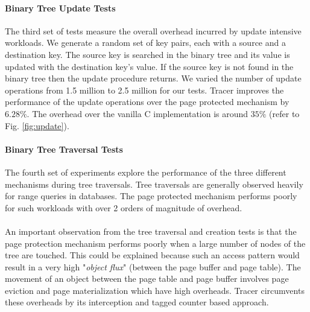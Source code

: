 \paragraph{Binary Tree Update Tests}
The third set of tests measure the overall overhead incurred by update intensive workloads. We generate a random set of key pairs, each with a source and a destination key. The source key is searched in the binary tree and its value is updated with the destination key's value. If the source key is not found in the binary tree then the update procedure returns. We varied the number of update operations from 1.5 million to 2.5 million for our tests. Tracer improves the performance of the update operations over the page protected mechanism by $6.28\%$. The overhead over the vanilla C implementation is around $35\%$ (refer to Fig. \ref{fig:update}). 

\paragraph{Binary Tree Traversal Tests}
The fourth set of experiments explore the performance of the three different mechanisms during tree traversals. Tree traversals are generally observed heavily for range queries in databases. The page protected mechanism performs poorly for such workloads with over 2 orders of magnitude of overhead. 

\paragraph{}
An important observation from the tree traversal and creation tests is that the page protection mechanism performs poorly when a large number of nodes of the tree are touched. This could be explained because such an access pattern would result in a very high "{\emph{object flux}}" (between the page buffer and page table). The movement of an object between the page table and page buffer involves page eviction and page materialization which have high overheads. Tracer circumvents these overheads by its interception and tagged counter based approach. 
